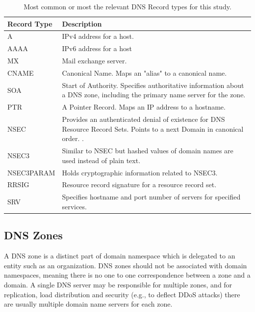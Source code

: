 \begin{table}[th]
\caption{Most common or most the relevant DNS Record types for this study.}
\label{table:dns_record_types}
\begin{center}
\begin{tabular}{|p{}|p{}|} 
    \hline
Record Type & Description \\
    \hline
    \hline
A & IPv4 address for a host. \cite{RFC1035}\\ 
    \hline
AAAA & IPv6 address for a host \cite{RFC3596}\\
    \hline
MX & Mail exchange server. \cite{RFC1035} \\
    \hline
CNAME & Canonical Name. Maps an "alias" to a canonical name. \cite{RFC1035} \\
    \hline
SOA & Start of Authority. Specifies authoritative information about a DNS zone, including the primary name server for the zone. \cite{RFC1035}\\    \hline
PTR & A Pointer Record. Maps an IP address to a hostname. \cite{RFC1035} \\
    \hline
    
NSEC & Provides an authenticated denial of
   existence for DNS Resource Record Sets. Points to a next Domain in canonical order. \cite{RFC3845}. 
\\
\hline
NSEC3 & Similar to NSEC but hashed values of domain names are used instead of plain text. \cite{RFC5155} \\
\hline

NSEC3PARAM & Holds cryptographic information related to NSEC3. \cite{RFC5155}\\
\hline

RRSIG & Resource record signature for a resource record set. \cite{RFC4034}\\
\hline

SRV & Specifies hostname and port number of servers for specified services. \cite{RFC2782}\\
\hline


\end{tabular}
\end{center}
\end{table}


\subsection{DNS Zones}
\label{sec:dns_zones}

A DNS zone is a distinct part of domain namespace which is delegated to an entity such as an organization. DNS zones should not be associated with domain namespaces, meaning there is no one to one correspondence between a zone and a domain. A single DNS server may be responsible for multiple zones, and for replication, load distribution and security (e.g., to deflect DDoS attacks) there are usually multiple domain name servers for each zone. \citep{tanenbaum}

